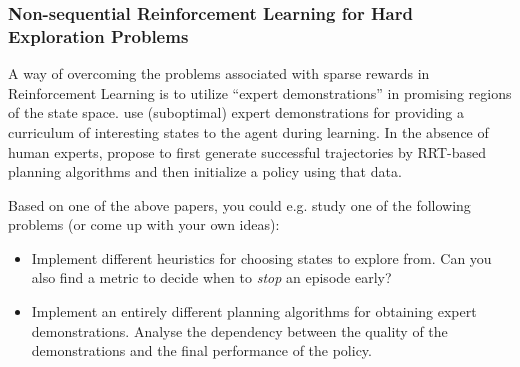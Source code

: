 \documentclass[a4paper]{article}
\begin{document}

\subsubsection{Non-sequential Reinforcement Learning for Hard Exploration Problems}
A way of overcoming the problems associated with sparse rewards in Reinforcement Learning is to utilize ``expert demonstrations'' in promising regions of the state space.
\citet{bauza2024demostart} use (suboptimal) expert demonstrations for providing a curriculum of interesting states to the agent during learning.
In the absence of human experts, \citet{blau2021learning} propose to first generate successful trajectories by RRT-based planning algorithms and then initialize a policy using that data. 

Based on one of the above papers, you could e.g. study one of the following problems (or come up with your own ideas):
\begin{itemize}
  \item Implement different heuristics for choosing states to explore from. Can you also find a metric to decide when to \textit{stop} an episode early?
  \item Implement an entirely different planning algorithms for obtaining expert demonstrations. Analyse the dependency between the quality of the demonstrations and the final performance of the policy.
\end{itemize}
\end{document}
